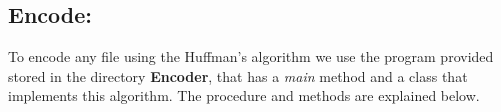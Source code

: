 \subsection{Encode:}

To encode any file using the Huffman's algorithm we use the program provided stored in the directory {\bfseries Encoder}, that has a {\itshape main} method and a class that implements this algorithm. The procedure and methods are explained below.